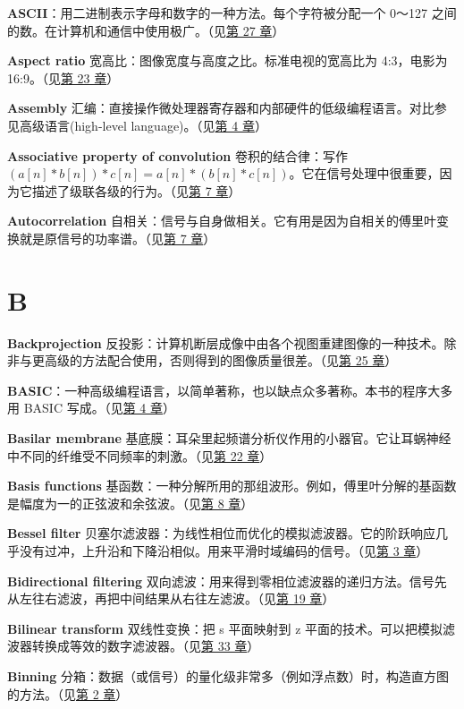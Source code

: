 \textbf{ASCII}：用二进制表示字母和数字的一种方法。每个字符被分配一个
0～127 之间的数。在计算机和通信中使用极广。（见\hyperref[ch-27]{第 27
章}）

\textbf{Aspect ratio} 宽高比：图像宽度与高度之比。标准电视的宽高比为
4:3，电影为 16:9。（见\hyperref[ch-23]{第 23 章}）

\textbf{Assembly}
汇编：直接操作微处理器寄存器和内部硬件的低级编程语言。对比参见高级语言(high-level
language)。（见\hyperref[ch-04]{第 4 章}）

\textbf{Associative property of convolution} 卷积的结合律：写作
\((a[n] * b[n]) * c[n] = a[n] * (b[n] * c[n])\)。它在信号处理中很重要，因为它描述了级联各级的行为。（见\hyperref[ch-07]{第
7 章}）

\textbf{Autocorrelation}
自相关：信号与自身做相关。它有用是因为自相关的傅里叶变换就是原信号的功率谱。（见\hyperref[ch-07]{第
7 章}）

\section{B}

\textbf{Backprojection}
反投影：计算机断层成像中由各个视图重建图像的一种技术。除非与更高级的方法配合使用，否则得到的图像质量很差。（见\hyperref[ch-25]{第
25 章}）

\textbf{BASIC}：一种高级编程语言，以简单著称，也以缺点众多著称。本书的程序大多用
BASIC 写成。（见\hyperref[ch-04]{第 4 章}）

\textbf{Basilar membrane}
基底膜：耳朵里起频谱分析仪作用的小器官。它让耳蜗神经中不同的纤维受不同频率的刺激。（见\hyperref[ch-22]{第
22 章}）

\textbf{Basis functions}
基函数：一种分解所用的那组波形。例如，傅里叶分解的基函数是幅度为一的正弦波和余弦波。（见\hyperref[ch-08]{第
8 章}）

\textbf{Bessel filter}
贝塞尔滤波器：为线性相位而优化的模拟滤波器。它的阶跃响应几乎没有过冲，上升沿和下降沿相似。用来平滑时域编码的信号。（见\hyperref[ch-03]{第
3 章}）

\textbf{Bidirectional filtering}
双向滤波：用来得到零相位滤波器的递归方法。信号先从左往右滤波，再把中间结果从右往左滤波。（见\hyperref[ch-19]{第
19 章}）

\textbf{Bilinear transform} 双线性变换：把 s 平面映射到 z
平面的技术。可以把模拟滤波器转换成等效的数字滤波器。（见\hyperref[ch-33]{第
33 章}）

\textbf{Binning}
分箱：数据（或信号）的量化级非常多（例如浮点数）时，构造直方图的方法。（见\hyperref[ch-02]{第
2 章}）

